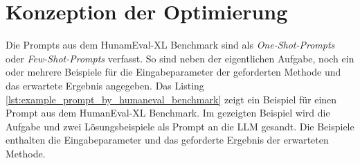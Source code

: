 \section{Konzeption der Optimierung}\label{sec:conzept_of_optimization_prompt}


Die Prompts aus dem HunamEval-XL Benchmark sind als \textit{One-Shot-Prompts} oder \textit{Few-Shot-Prompts} verfasst. So sind neben der eigentlichen Aufgabe, noch ein oder mehrere Beispiele für die Eingabeparameter der geforderten Methode und das erwartete Ergebnis angegeben. Das Listing \ref{lst:example_prompt_by_humaneval_benchmark} zeigt ein Beispiel für einen Prompt aus dem HumanEval-XL Benchmark. Im gezeigten Beispiel wird die Aufgabe und zwei Lösungsbeispiele als Prompt an die LLM gesandt. Die Beispiele enthalten die Eingabeparameter und das geforderte Ergebnis der erwarteten Methode.\vspace{0.2cm}

